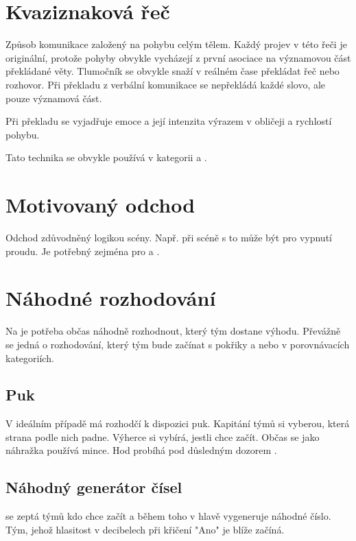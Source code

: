  
 
\needspace{5cm} \section{Kvaziznaková řeč} \label{kvaziznaková řeč} Způsob komunikace založený na pohybu celým tělem. Každý projev v této řeči je originální, protože pohyby obvykle vycházejí z první asociace na významovou část překládané věty. Tlumočník se obvykle snaží v reálném čase překládat řeč nebo rozhovor. Při překladu z verbální komunikace se nepřekládá každé slovo, ale pouze významová část. 
 
Při překladu se vyjadřuje emoce a její intenzita výrazem v obličeji a rychlostí pohybu. 
 
Tato technika se obvykle používá v kategorii  a . 
 
 
\needspace{5cm} \section{Motivovaný odchod} \label{motivovaný odchod} Odchod zdůvodněný logikou scény. Např. při scéně s  to může být pro vypnutí proudu. Je potřebný zejména pro  a . 
 
 
\needspace{5cm} \section{Náhodné rozhodování} \label{náhodné rozhodování} Na  je potřeba občas náhodně rozhodnout, který tým dostane výhodu. Převážně se jedná o rozhodování, který tým bude začínat s pokřiky a nebo v porovnávacích kategoriích. 
 
\subsection{ Puk } V ideálním případě má rozhodčí k dispozici puk. Kapitání týmů si vyberou, která strana podle nich padne. Výherce si vybírá, jestli chce začít. Občas se jako náhražka používá mince. Hod probíhá pod důsledným dozorem . 
 
\subsection{ Náhodný generátor čísel }  se zeptá týmů kdo chce začít a během toho v hlavě vygeneruje náhodné číslo. Tým, jehož hlasitost v decibelech při křičení "Ano"{} je blíže začíná. 
 
